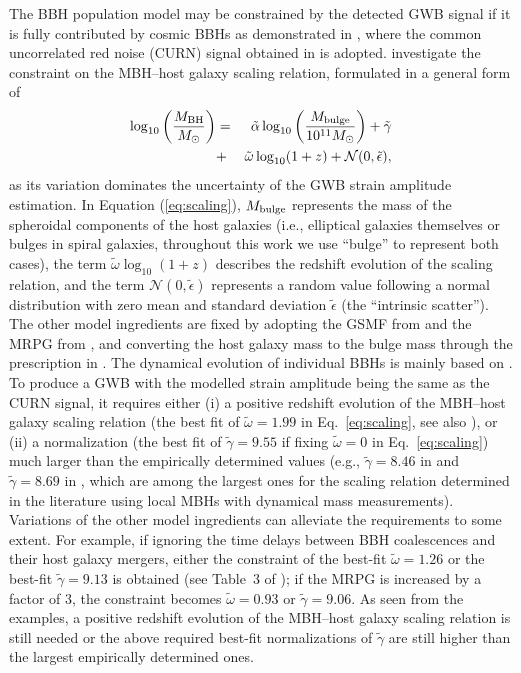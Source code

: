 \documentclass[twocolumn]{aastex631}
\newcommand{\talpha}{{\tilde{\alpha}}}
\newcommand{\tgamma}{{\tilde{\gamma}}}
\newcommand{\tomega}{{\tilde{\omega}}}
\newcommand{\tepsilon}{{\tilde{\epsilon}}}
\newcommand{\calN}{{\mathcal{N}}}
\newcommand{\bulge}{_{\rm bulge}}
\begin{document}
The BBH population model may be constrained by the detected GWB signal if it is
fully contributed by cosmic BBHs as demonstrated in \citet{CYL23cgws}, where
the common uncorrelated red noise (CURN) signal obtained in \citet{NG20cps}
is adopted.
\citet{CYL23cgws} investigate the constraint on the MBH--host galaxy scaling
relation, 
formulated in a general form of
%
\begin{eqnarray}
%
\log_{10}\left(\frac{M_{\rm BH}}{M_\odot}\right) &=&
%
\talpha\log_{10}\left(\frac{M\bulge}{10^{11}M_\odot}\right)+\tgamma \nonumber\\
%
&+&\tomega\log_{10}(1+z)+\calN(0,\tepsilon),
%
\label{eq:scaling}
%
\end{eqnarray}
%
as its variation dominates the uncertainty of the GWB strain amplitude
estimation.
%
In Equation (\ref{eq:scaling}), $M\bulge$ represents the mass of the spheroidal
components of the host galaxies (i.e., elliptical galaxies themselves or bulges
in spiral galaxies, throughout this work we use ``bulge'' to represent both
cases), the term $\tomega\log_{10}(1+z)$ describes the
redshift evolution of the scaling relation, and the term $\calN(0,\tepsilon)$
represents a random value following a normal distribution with zero mean and
standard deviation $\tepsilon$ (the ``intrinsic scatter'').
The other model ingredients are fixed by adopting the GSMF from \citet{Behroozi19} and the MRPG
from \citet{RodriguezGomez15}, and converting the host galaxy mass to the bulge
mass through the prescription in \citet{Ravi15}. The dynamical evolution of
individual BBHs is mainly based on \citet{Yu02}. 
%
To produce a GWB with the modelled strain amplitude being the same as the CURN
signal, it requires either (i) a positive redshift evolution of the
MBH--host galaxy scaling relation (the best fit of $\tomega=1.99$ in Eq.~\ref{eq:scaling}, see
also \citealt{Muhamed23}), or (ii) 
a normalization (the best fit of $\tgamma=9.55$ if fixing $\tomega=0$ in Eq.~\ref{eq:scaling}) much larger than the
empirically determined values (e.g., $\tgamma=8.46$ in \citealt{MM13} and
$\tgamma=8.69$ in \citealt{KH13}, which are among the largest ones for the
scaling relation determined in the literature using local MBHs with
dynamical mass measurements).
Variations of the other model ingredients can alleviate the requirements to
some extent. For example, if ignoring the time delays between BBH coalescences
and their host galaxy mergers, either the constraint of the best-fit
$\tomega=1.26$ or the best-fit $\tgamma=9.13$ is obtained (see Table~3 of
\citealt{CYL23cgws}); if the MRPG is increased by a factor of $3$, the
constraint becomes $\tomega=0.93$ or $\tgamma=9.06$. As seen from the examples,
a positive redshift evolution of the MBH–host galaxy scaling relation is still
needed or the above required best-fit normalizations of $\tgamma$ are still
higher than the largest empirically determined ones.
%
\end{document}
